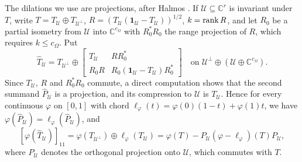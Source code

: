 The dilations we use are projections, after Halmos \cite{Halmos1969}. If $\mathcal{U}\subseteq\mathbb{C}^r$ is invariant under $T$, write $T=T_{\mathcal{U}}\oplus T_{\mathcal{U}^\perp}$, $R=(T_{\mathcal{U}}(\mathbf{1}_{\mathcal{U}}-T_{\mathcal{U}}))^{1/2}$, $k=\operatorname{rank} R$, and let $R_0$ be a partial isometry from $\mathcal{U}$ into $\mathbb{C}^{c_\Omega}$ with $R_0^*R_0$ the range projection of $R$, which requires $k\leq c_\Omega$. Put
\begin{equation}\label{cont:eq:halmos}
\widehat T_{\mathcal{U}}=T_{\mathcal{U}^\perp}\oplus\begin{bmatrix}T_{\mathcal{U}}&RR_0^*\\R_0R&R_0(\mathbf{1}_{\mathcal{U}}-T_{\mathcal{U}})R_0^*\end{bmatrix}\quad\text{on }\mathcal{U}^\perp\oplus(\mathcal{U}\oplus\mathbb{C}^{c_\Omega}).
\end{equation}
Since $T_{\mathcal{U}}$, $R$ and $R_0^*R_0$ commute, a direct computation shows that the second summand $\widehat P_{\mathcal{U}}$ is a projection, and its compression to $\mathcal{U}$ is $T_{\mathcal{U}}$. Hence for every continuous $\varphi$ on $[0,1]$ with chord $\ell_\varphi(t)=\varphi(0)(1-t)+\varphi(1)t$, we have $\varphi(\widehat P_{\mathcal{U}})=\ell_\varphi(\widehat P_{\mathcal{U}})$, and
\begin{equation}\label{cont:eq:halmos compression}
[\varphi(\widehat T_{\mathcal{U}})]_{11}=\varphi(T_{\mathcal{U}^\perp})\oplus\ell_\varphi(T_{\mathcal{U}})=\varphi(T)-P_{\mathcal{U}}(\varphi-\ell_\varphi)(T)P_{\mathcal{U}},
\end{equation}
where $P_{\mathcal{U}}$ denotes the orthogonal projection onto $\mathcal{U}$, which commutes with $T$.

